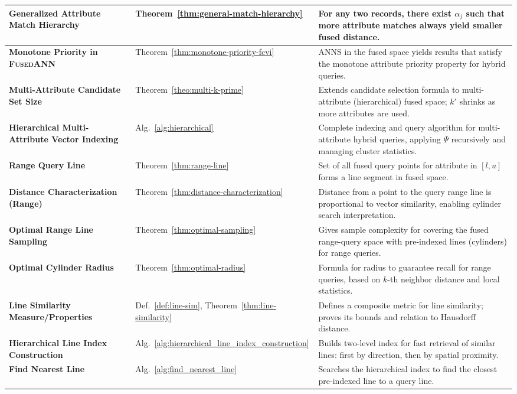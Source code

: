 \documentclass[numbers,sort]{article}
\begin{document}
\begin{longtable}{p{4.5cm} p{1.5cm} p{7.2cm}}
\midrule
\textbf{Generalized Attribute Match Hierarchy} & Theorem~\ref{thm:general-match-hierarchy} & For any two records, there exist $\alpha_j$ such that more attribute matches always yield smaller fused distance. \\
\midrule
\textbf{Monotone Priority in \textsc{FusedANN}} & Theorem~\ref{thm:monotone-priority-fcvi} & ANNS in the fused space yields results that satisfy the monotone attribute priority property for hybrid queries. \\
\midrule
\textbf{Multi-Attribute Candidate Set Size} & Theorem~\ref{theo:multi-k-prime} & Extends candidate selection formula to multi-attribute (hierarchical) fused space; $k'$ shrinks as more attributes are used. \\
\midrule
\textbf{Hierarchical Multi-Attribute Vector Indexing} & Alg.~\ref{alg:hierarchical} & Complete indexing and query algorithm for multi-attribute hybrid queries, applying $\Psi$ recursively and managing cluster statistics. \\
\midrule
\textbf{Range Query Line} & Theorem~\ref{thm:range-line} & Set of all fused query points for attribute in $[l,u]$ forms a line segment in fused space. \\
\midrule
\textbf{Distance Characterization (Range)} & Theorem~\ref{thm:distance-characterization} & Distance from a point to the query range line is proportional to vector similarity, enabling cylinder search interpretation. \\
\midrule
\textbf{Optimal Range Line Sampling} & Theorem~\ref{thm:optimal-sampling} & Gives sample complexity for covering the fused range-query space with pre-indexed lines (cylinders) for range queries. \\
\midrule
\textbf{Optimal Cylinder Radius} & Theorem~\ref{thm:optimal-radius} & Formula for radius to guarantee recall for range queries, based on $k$-th neighbor distance and local statistics. \\
\midrule
\textbf{Line Similarity Measure/Properties} & Def.~\ref{def:line-sim}, Theorem~\ref{thm:line-similarity} & Defines a composite metric for line similarity; proves its bounds and relation to Hausdorff distance. \\
\midrule
\textbf{Hierarchical Line Index Construction} & Alg.~\ref{alg:hierarchical_line_index_construction} & Builds two-level index for fast retrieval of similar lines: first by direction, then by spatial proximity. \\
\midrule
\textbf{Find Nearest Line} & Alg.~\ref{alg:find_nearest_line} & Searches the hierarchical index to find the closest pre-indexed line to a query line. \\

\end{longtable}
\end{document}
